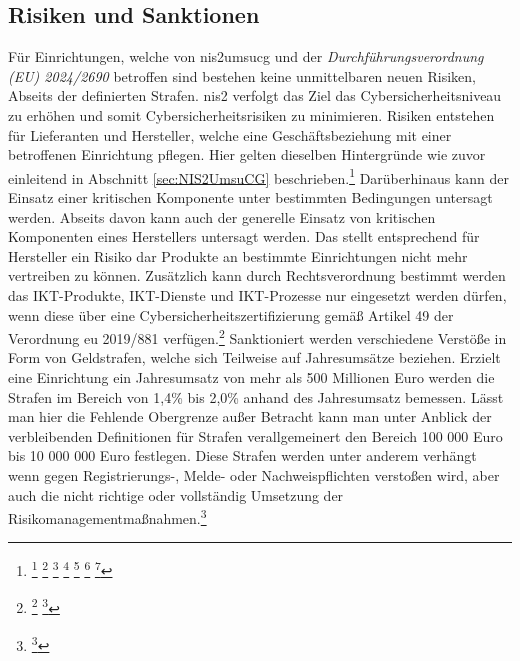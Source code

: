\documentclass[11pt,a4paper,hidelinks]{article}   %
\begin{document}
        \subsection{Risiken und Sanktionen}
        Für Einrichtungen, welche von \gls{nis2umsucg} und der \emph{Durchführungsverordnung (EU) 2024/2690} betroffen sind bestehen keine unmittelbaren neuen Risiken, Abseits der definierten Strafen. \gls{nis2} verfolgt das Ziel das Cyber­sicherheits­niveau zu erhöhen und somit Cybersicherheitsrisiken zu minimieren. Risiken entstehen für Lieferanten und Hersteller, welche eine Geschäftsbeziehung mit einer betroffenen Einrichtung pflegen. Hier gelten dieselben Hintergründe wie zuvor einleitend in Abschnitt \ref{sec:NIS2UmsuCG} beschrieben.\footnote{
            \footcite[Vgl. §30 Absatz 6,][]{NIS2UmsuCG}
            \footcite[Vgl. §56 Absatz 3,][]{NIS2UmsuCG}
            \footcite[Vgl. Nummer 5.1.1. \& 5.1.2.,][, Anhang]{EU2024-2690}
            \footcite[Vgl. Nummer 5.1.4. \& 5.1.5.,][, Anhang]{EU2024-2690}
            \footcite[Vgl. Nummer 6.1.1. \& 6.1.2.,][, Anhang]{EU2024-2690}
            \footcite[Vgl. Nummer 6.1.1. \& 6.1.2.,][, Anhang]{EU2024-2690}
            \footcite[Vgl. Nummer 6.2.2 \& 6.2.3.,][, Anhang]{EU2024-2690}
        } Darüberhinaus kann der Einsatz einer kritischen Komponente unter bestimmten Bedingungen untersagt werden. Abseits davon kann auch der generelle Einsatz von kritischen Komponenten eines Herstellers untersagt werden. Das stellt entsprechend für Hersteller ein Risiko dar Produkte an bestimmte Einrichtungen nicht mehr vertreiben zu können. Zusätzlich kann durch Rechtsverordnung bestimmt werden das IKT-Produkte, IKT-Dienste und IKT-Prozesse nur eingesetzt werden dürfen, wenn diese über eine Cybersicherheitszertifizierung gemäß Artikel 49 der Verordnung \gls{eu} 2019/881 verfügen.\footnote{
            \footcite[Vgl. §30, Absatz 6,][]{NIS2UmsuCG}
            \footcite[Vgl. §41,][]{NIS2UmsuCG}
        }\medbreak
        Sanktioniert werden verschiedene Verstöße in Form von Geldstrafen, welche sich Teilweise auf Jahresumsätze beziehen. Erzielt eine Einrichtung ein Jahresumsatz von mehr als 500 Millionen Euro werden die Strafen im Bereich von 1,4\% bis 2,0\% anhand des Jahresumsatz bemessen. Lässt man hier die Fehlende Obergrenze außer Betracht kann man unter Anblick der verbleibenden Definitionen für Strafen verallgemeinert den Bereich 100 000 Euro bis 10 000 000 Euro festlegen. Diese Strafen werden unter anderem verhängt wenn gegen Registrierungs-, Melde- oder Nachweispflichten verstoßen wird, aber auch die nicht richtige oder vollständig Umsetzung der Risikomanagementmaßnahmen.\footnote{
            \footcite[Vgl. §65,][]{NIS2UmsuCG}
        }
\end{document}
